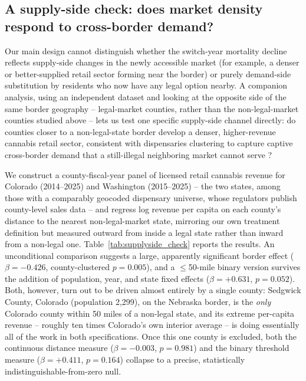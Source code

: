 \documentclass{article}
\begin{document}


\subsection{A supply-side check: does market density respond to cross-border demand?}
\label{sec:supplyside}

Our main design cannot distinguish whether the switch-year mortality decline reflects supply-side changes in
the newly accessible market (for example, a denser or better-supplied retail sector forming near the border) or
purely demand-side substitution by residents who now have any legal option nearby. A companion analysis, using
an independent dataset and looking at the opposite side of the same border geography -- legal-market counties,
rather than the non-legal-market counties studied above -- lets us test one specific supply-side channel
directly: do counties closer to a non-legal-state border develop a denser, higher-revenue cannabis retail
sector, consistent with dispensaries clustering to capture captive cross-border demand that a still-illegal
neighboring market cannot serve \citep{HaoCowan2020,Lovenheim2008,Beatty2009}?

We construct a county-fiscal-year panel of licensed retail cannabis revenue for Colorado (2014--2025) and
Washington (2015--2025) -- the two states, among those with a comparably geocoded dispensary universe, whose
regulators publish county-level sales data -- and regress log revenue per capita on each county's distance to
the nearest non-legal-market state, mirroring our own treatment definition but measured outward from inside a
legal state rather than inward from a non-legal one. Table~\ref{tab:supplyside_check} reports the results. An
unconditional comparison suggests a large, apparently significant border effect ($\beta=-0.426$, county-clustered
$p=0.005$), and a $\leq$50-mile binary version survives the addition of population, year, and state fixed
effects ($\beta=+0.631$, $p=0.052$). Both, however, turn out to be driven almost entirely by a single county:
Sedgwick County, Colorado (population 2{,}299), on the Nebraska border, is the \emph{only} Colorado county
within 50 miles of a non-legal state, and its extreme per-capita revenue -- roughly ten times Colorado's own
interior average -- is doing essentially all of the work in both specifications. Once this one county is
excluded, both the continuous distance measure ($\beta=-0.003$, $p=0.981$) and the binary threshold measure
($\beta=+0.411$, $p=0.164$) collapse to a precise, statistically indistinguishable-from-zero null.
\end{document}
